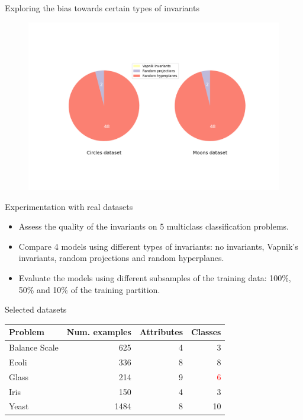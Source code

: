 \documentclass[10pt, dvipsnames]{beamer}
\begin{document}
\begin{frame}{Exploring the bias towards certain types of invariants}
    \begin{figure}
        \centering
        \includegraphics[width=\textwidth]{thesis/Figures/mean_num_selected.png}
    \end{figure}
\end{frame}

\begin{frame}{Experimentation with real datasets}
    \begin{itemize}
        \item<1-> Assess the quality of the invariants on 5 multiclass classification problems.
        \item<2-> Compare 4 models using different types of invariants: no invariants,
        Vapnik's invariants, random projections and random hyperplanes.
        \item<3-> Evaluate the models using different subsamples of the training data:
        100\%, 50\% and 10\% of the training partition.
    \end{itemize}
\end{frame}


\begin{frame}{Selected datasets}

\begin{table}[H]
\centering
\begin{tabular}{lrrr}
\textbf{Problem} & \textbf{Num. examples} & \textbf{Attributes} & \textbf{Classes} \\ \hline
Balance Scale    & 625                    & 4                   & 3                \\
Ecoli            & 336                    & 8                   & 8                \\
Glass            & 214                    & 9                   & \textcolor{red}{6} \\
Iris             & 150                    & 4                   & 3                \\
Yeast            & 1484                   & 8                   & 10              
\end{tabular}
\end{table}
    
\end{frame}
\end{document}
